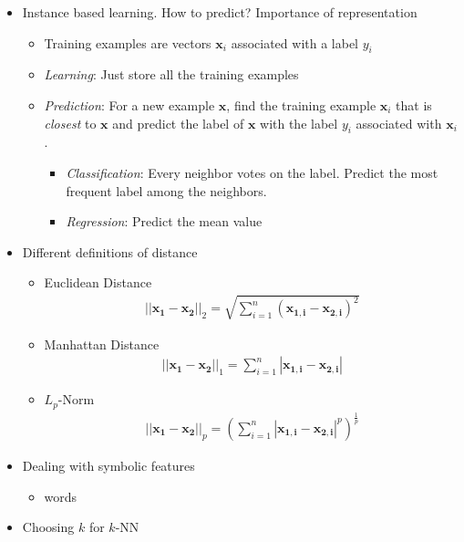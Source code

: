 \documentclass{article}
\begin{document}
\begin{itemize}
\item Instance based learning. How to predict? Importance of representation
	\begin{itemize}
	\item Training examples are vectors $\mathbf{x}_{i}$ associated with a label $y_{i}$
	\item {\em Learning}: Just store all the training examples
	\item {\em Prediction}: For a new example $\mathbf{x}$, find the training example $\mathbf{x}_{i}$ that is {\em closest} to $\mathbf{x}$ and predict the label of $\mathbf{x}$ with the label $y_{i}$ associated with $\mathbf{x}_{i}$.
	\begin{itemize}
		\item {\em Classification}: Every neighbor votes on the label. Predict the most frequent label among the neighbors.
		\item {\em Regression}: Predict the mean value
	\end{itemize}
	\end{itemize}
\item Different definitions of distance
	\begin{itemize}
	\item Euclidean Distance
	\begin{align*}
	\left|\left| \mathbf{x_{1}} - \mathbf{x_{2}}\right|\right|_{2} = \sqrt{\sum_{i=1}^{n}\left(\mathbf{x_{1,i}}-\mathbf{x_{2,i}}\right)^{2}}
	\end{align*}
	\item Manhattan Distance
	\begin{align*}
	\left|\left| \mathbf{x_{1}} - \mathbf{x_{2}}\right|\right|_{1} = \sum_{i=1}^{n}\left|\mathbf{x_{1,i}}-\mathbf{x_{2,i}}\right|
	\end{align*}
	\item $L_{p}$-Norm
	\begin{align*}
	\left|\left| \mathbf{x_{1}} - \mathbf{x_{2}}\right|\right|_{p} = \left( \sum_{i=1}^{n}\left|\mathbf{x_{1,i}}-\mathbf{x_{2,i}} \right|^{p} \right)^{\frac{1}{p}}
	\end{align*}
	\end{itemize}
\item Dealing with symbolic features
	\begin{itemize}
	\item words
	\end{itemize}
\item Choosing $k$ for $k$-NN
	\begin{itemize}

\end{itemize}
\end{itemize}
\end{document}
